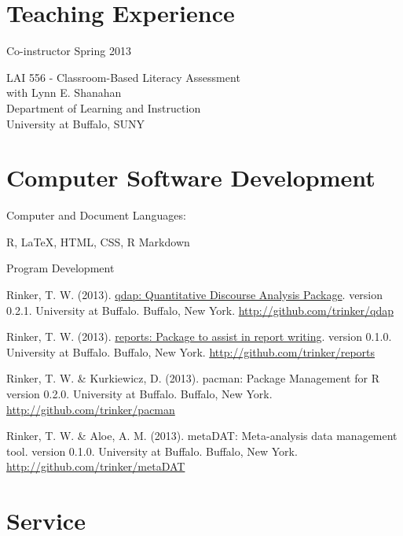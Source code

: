 \section{Teaching Experience}

Co-instructor \hfill {Spring 2013}
\begin{innerlist}
\item[] LAI 556 - Classroom-Based Literacy Assessment\\
        with Lynn E. Shanahan\\
        Department of Learning and Instruction\\
        University at Buffalo, SUNY
\end{innerlist}

\section{Computer Software Development}
Computer and Document Languages:
%
\begin{innerlist}
    \item R, \LaTeX, HTML, CSS, R Markdown
\end{innerlist}

\halfblankline

Program Development
\begin{innerlist}
    \item Rinker, T. W. (2013). \href{http://cran.r-project.org/web/packages/qdap/index.html}{qdap: Quantitative Discourse Analysis Package}. version 0.2.1. University at Buffalo. Buffalo, New York. \url{http://github.com/trinker/qdap}
    \item Rinker, T. W. (2013). \href{http://cran.r-project.org/web/packages/reports/index.html}{reports: Package to assist in report writing}. version 0.1.0. University at Buffalo. Buffalo, New York. \url{http://github.com/trinker/reports}
    \item Rinker, T. W. \& Kurkiewicz, D. (2013). pacman: Package Management for R version 0.2.0. University at Buffalo. Buffalo, New York. \url{http://github.com/trinker/pacman}
    \item Rinker, T. W. \& Aloe, A. M. (2013). metaDAT: Meta-analysis data management tool. version 0.1.0. University at Buffalo. Buffalo, New York. \\ \url{http://github.com/trinker/metaDAT}
\end{innerlist}

\section{Service}

